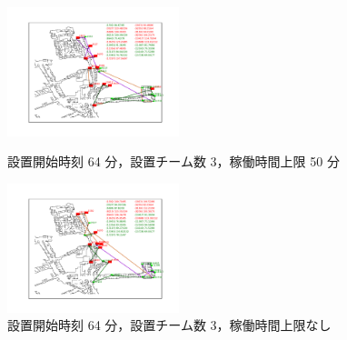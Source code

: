 \documentclass[a4paper,12pt,fleqn]{jarticle}
\begin{document}
\begin{figure}
 \begin{center}
  \begin{minipage}{0.49\hsize}
   \begin{center}
    \includegraphics[width=5cm,trim=100 50 100 50]{fig/64min_3team_lim50min.pdf}
    \caption{設置開始時刻 64 分，\newline \quad 設置チーム数 3，稼働時間上限 50 分}
    \label{fig:64min_3team_lim50min}
   \end{center}
  \end{minipage}
  \begin{minipage}{0.49\hsize}
   \begin{center}
    \includegraphics[width=5cm,trim=100 50 100 50]{fig/64min_3team_nolim.pdf}
    \caption{設置開始時刻 64 分，\newline \quad 設置チーム数 3，稼働時間上限なし}
    \label{fig:64min_3team_nolim}
   \end{center}
  \end{minipage}
 \end{center}
\end{figure}
\end{document}
